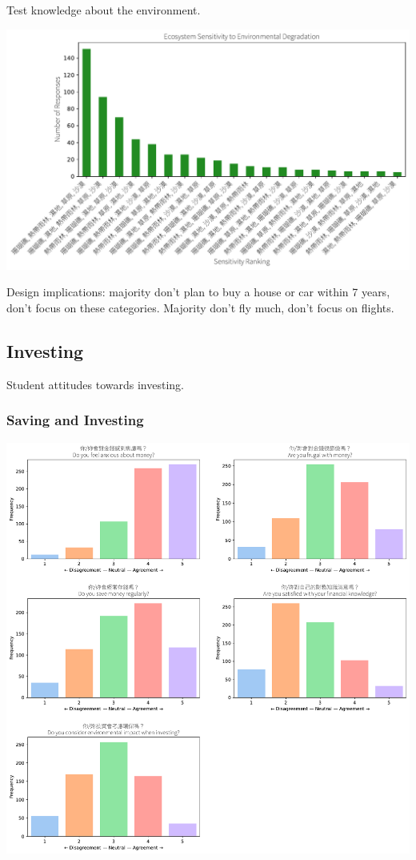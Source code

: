 \documentclass[
  letterpaper,
  DIV=11,
  numbers=noendperiod]{scrartcl}
\begin{document}
Test knowledge about the environment.

\includegraphics{_thesis_files/figure-pdf/cell-72-output-1.pdf}

Design implications: majority don't plan to buy a house or car within 7
years, don't focus on these categories. Majority don't fly much, don't
focus on flights.

\newpage

\subsection{Investing}\label{investing-1}

Student attitudes towards investing.

\subsubsection{Saving and Investing}\label{saving-and-investing}

\includegraphics{_thesis_files/figure-pdf/cell-74-output-1.pdf}
\end{document}
